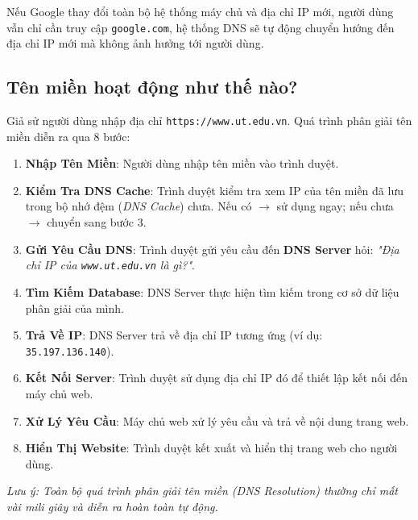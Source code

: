 \documentclass[11pt,oneside]{book}
\newcommand{\codeinline}[1]{\textcolor{accentOrange}{\texttt{#1}}}
\begin{document}
\begin{tipBox}
Nếu Google thay đổi toàn bộ hệ thống máy chủ và địa chỉ IP mới, người dùng vẫn chỉ cần truy cập \codeinline{google.com}, hệ thống DNS sẽ tự động chuyển hướng đến địa chỉ IP mới mà không ảnh hưởng tới người dùng.
\end{tipBox}

\subsection{Tên miền hoạt động như thế nào?}

Giả sử người dùng nhập địa chỉ \codeinline{https://www.ut.edu.vn}. Quá trình phân giải tên miền diễn ra qua 8 bước:

\begin{conceptBox}
\begin{enumerate}[label=\textbf{\color{conceptBorder}Bước \arabic*:}, leftmargin=4.8em, itemsep=3pt, parsep=0pt, topsep=4pt]
    \item \textbf{Nhập Tên Miền}: Người dùng nhập tên miền vào trình duyệt.
    \item \textbf{Kiểm Tra DNS Cache}: Trình duyệt kiểm tra xem IP của tên miền đã lưu trong bộ nhớ đệm (\textit{DNS Cache}) chưa. Nếu có $\rightarrow$ sử dụng ngay; nếu chưa $\rightarrow$ chuyển sang bước 3.
    \item \textbf{Gửi Yêu Cầu DNS}: Trình duyệt gửi yêu cầu đến \textbf{DNS Server} hỏi: \textit{"Địa chỉ IP của \codeinline{www.ut.edu.vn} là gì?"}.
    \item \textbf{Tìm Kiếm Database}: DNS Server thực hiện tìm kiếm trong cơ sở dữ liệu phân giải của mình.
    \item \textbf{Trả Về IP}: DNS Server trả về địa chỉ IP tương ứng (ví dụ: \codeinline{35.197.136.140}).
    \item \textbf{Kết Nối Server}: Trình duyệt sử dụng địa chỉ IP đó để thiết lập kết nối đến máy chủ web.
    \item \textbf{Xử Lý Yêu Cầu}: Máy chủ web xử lý yêu cầu và trả về nội dung trang web.
    \item \textbf{Hiển Thị Website}: Trình duyệt kết xuất và hiển thị trang web cho người dùng.
\end{enumerate}
\end{conceptBox}
\textit{Lưu ý: Toàn bộ quá trình phân giải tên miền (DNS Resolution) thường chỉ mất vài mili giây và diễn ra hoàn toàn tự động.}
\end{document}
